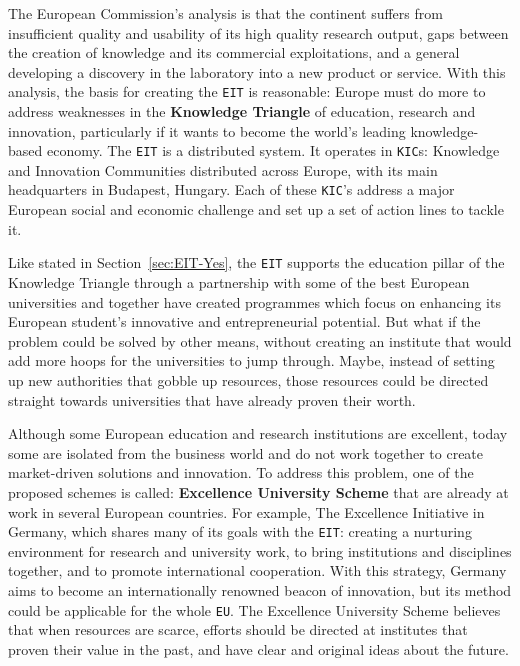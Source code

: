 \documentclass[11pt,a4paper,oneside,twocolumn]{IEEEtran}
\begin{document}
The European Commission's analysis is that the continent suffers from insufficient quality and usability of its high quality research output, gaps between the creation of knowledge and its commercial exploitations, and a general developing a discovery in the laboratory into a new product or service.\cite{6_1} With this analysis, the basis for creating the \texttt{EIT} is reasonable: Europe must do more to address weaknesses in the \textbf{Knowledge Triangle} of education, research and innovation, particularly if it wants to become the world's leading knowledge-based economy\cite{6_1}. The \texttt{EIT} is a distributed system. It operates in \texttt{KIC}s: Knowledge and Innovation Communities distributed across Europe, with its main headquarters in Budapest, Hungary. Each of these \texttt{KIC}'s address a major European social and economic challenge and set up a set of action lines to tackle it.

Like stated in Section~\ref{sec:EIT-Yes}, the \texttt{EIT} supports the education pillar of the Knowledge Triangle through a partnership with some of the best European universities and together have created programmes which focus on enhancing its European student's innovative and entrepreneurial  potential. But what if the problem could be solved by other means, without creating an institute that would add more hoops for the universities to jump through. Maybe, instead of setting up new authorities that gobble up resources, those resources could be directed straight towards universities  that have already proven their worth.

Although some European education and research institutions are excellent, today some are isolated from the business world and do not work together to create market-driven solutions and innovation. To address this problem, one of the proposed schemes is called: \textbf{Excellence University Scheme} that are already at work in several European countries. For example, The Excellence Initiative in Germany, which shares many of its goals with the \texttt{EIT}: creating a nurturing environment for research and university work, to bring institutions and disciplines together, and to promote international cooperation. With this strategy, Germany aims to become an internationally renowned beacon of innovation, but its method could be applicable for the whole \texttt{EU}\cite{6_3}. The Excellence University Scheme believes that when resources are scarce, efforts should be directed at institutes that proven their value in the past, and have clear and original ideas about the future.
\end{document}
